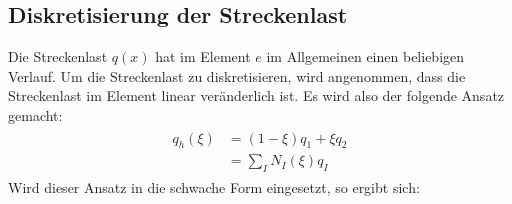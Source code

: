 \documentclass[letterpaper,10pt,german]{jupyterBook}
\begin{document}
\subsection{Diskretisierung der Streckenlast}
\label{\detokenize{chapters/chapter2/BalkenFEM:diskretisierung-der-streckenlast}}
\sphinxAtStartPar
Die Streckenlast \(q(x)\) hat im Element \(e\) im Allgemeinen einen beliebigen Verlauf. Um die Streckenlast zu diskretisieren, wird angenommen, dass die Streckenlast im Element linear veränderlich ist. Es wird also der folgende Ansatz gemacht:
\begin{equation}\label{equation:chapters/chapter2/BalkenFEM:AnsatzStreckenlast}
\begin{split}\begin{align}
  q_h(\xi) & = (1-\xi) q_1 + \xi q_2 \\
  & = \sum_I N_I(\xi)  q_I
\end{align}\end{split}
\end{equation}
\sphinxAtStartPar
Wird dieser Ansatz in die schwache Form eingesetzt, so ergibt sich:
\end{document}
